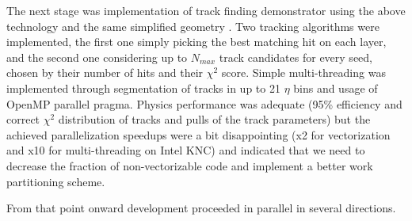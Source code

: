 \documentclass{webofc}
\begin{document}
The next stage was implementation of track finding demonstrator using the
above technology and the same simplified geometry \cite{pkf-finding}. Two
tracking algorithms were implemented, the first one simply picking the best
matching hit on each layer, and the second one considering up to $N_{max}$
track candidates for every seed, chosen by their number of hits and their
$\chi^2$ score. Simple multi-threading was implemented through segmentation of
tracks in up to 21 $\eta$ bins and usage of OpenMP parallel pragma. Physics
performance was adequate (95\% efficiency and correct $\chi^2$ distribution of
tracks and pulls of the track parameters) but the achieved parallelization
speedups were a bit disappointing (x2 for vectorization and x10 for
multi-threading on Intel KNC) and indicated that we need to decrease the
fraction of non-vectorizable code and implement a better work partitioning
scheme.

From that point onward development proceeded in parallel in several
directions.
\end{document}
